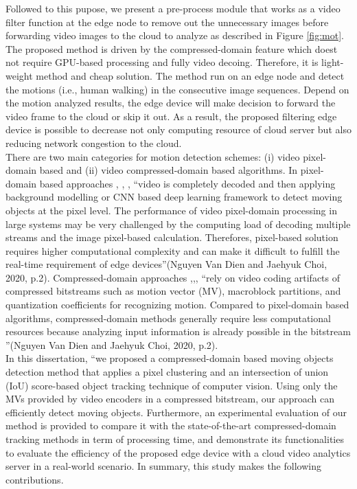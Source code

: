  Followed to this pupose, we present a pre-process module that works as a video filter function at the edge node to remove out the unnecessary images before forwarding video images to the cloud to analyze as described in Figure \ref{fig:mot}. The proposed method is driven by the compressed-domain feature which doest not require GPU-based processing and fully video decoing. Therefore, it is light-weight method and cheap solution. The  method run on an edge node and detect the motions (i.e., human walking) in the consecutive image sequences. Depend on the motion analyzed results, the edge device will make decision to forward the video frame to the cloud or skip it out. As a result, the proposed filtering edge device is possible to decrease not only computing resource of cloud server but also reducing network congestion to the cloud. \\
There are two main categories for motion detection schemes: (i) video pixel-domain based and (ii) video compressed-domain based algorithms. In pixel-domain based approaches \cite{lu2014moving}, \cite{kumar2016segmentation}, \cite{gujrathi2014detecting}, \cite{wang2019ground} “video is completely decoded and then applying background modelling or CNN based deep learning framework to detect moving objects at the pixel level. The performance of video pixel-domain processing in large systems may be very challenged by the computing load of decoding multiple streams and the image pixel-based calculation. Therefores, pixel-based solution requires higher computational complexity and can make it difficult to fulfill the real-time requirement of edge devices”(Nguyen Van Dien and Jaehyuk Choi, 2020, p.2). 
Compressed-domain approaches \cite{favalli2000object},\cite{yoneyama1999moving},\cite{dong2006object},\cite{achanta2002compressed} “rely on video coding artifacts of compressed bitstreams such as motion vector (MV), macroblock partitions, and quantization coefficients for recognizing motion. Compared to pixel-domain based algorithms, compressed-domain methods generally require less computational resources because analyzing input information is already possible in the bitstream ”(Nguyen Van Dien and Jaehyuk Choi, 2020, p.2). 
\\ In this dissertation, “we proposed a compressed-domain based moving objects detection method that applies a pixel clustering and an intersection of union (IoU) score-based object tracking technique of computer vision. Using only the MVs provided by video encoders in a compressed bitstream, our approach can efficiently detect moving objects. Furthermore, an experimental evaluation of our method is provided to compare it with the state-of-the-art compressed-domain tracking methods in term of processing time, and demonstrate its functionalities to evaluate the efficiency of the proposed edge device with a cloud video analytics server in a real-world scenario. In summary, this study makes the following contributions.
